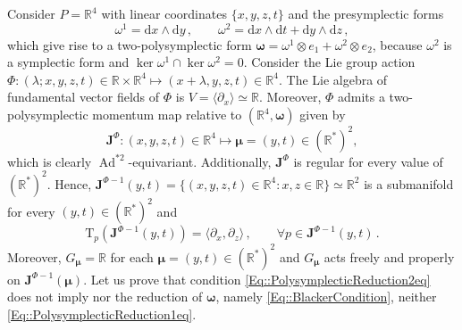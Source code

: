 \documentclass[11pt]{article}
\theoremstyle{plain}
\theoremstyle{definition}
\newcommand{\T}{\mathrm{T}}
\newcommand{\bomega}{{\boldsymbol{\omega}}}
\renewcommand{\d}{\mathrm{d}}
\DeclareMathOperator{\Ad}{Ad}
\def\d{\mathrm{d}}
\numberwithin{equation}{section}
\begin{document}
Consider $P=\mathbb{R}^4$ with linear coordinates $\{x,y,z,t\}$ and the presymplectic forms
$$
    \omega^1 = \d x\wedge \d y\,,\qquad \omega^2 = \d x\wedge \d t + \d y\wedge\d z\,,
$$
which give rise to a two-polysymplectic form $\bm\omega=\omega^1\otimes e_1+\omega^2\otimes e_2$, because $\omega^2$ is a symplectic form and $\ker\omega^1\cap \ker \omega^2=0$.
Consider the Lie group action 
$\Phi:(\lambda;x,y,z,t)\in \mathbb{R}\times \mathbb{R}^4\mapsto (x+\lambda,y,z,t)\in \mathbb{R}^4$. The Lie algebra of fundamental vector fields of $\Phi$ is $V=\langle \partial_x\rangle\simeq \mathbb{R}$. Moreover, $\Phi$ admits a two-polysymplectic momentum map relative to $(\mathbb{R}^4,\bomega)$ given by 
$$
    \mathbf{J}^\Phi:(x,y,z,t)\in \mathbb{R}^4\longmapsto \bm\mu=(y,t)\in (\mathbb{R}^*)^2,
$$
which is clearly $\Ad^{*2}$-equivariant. Additionally, $\mathbf{J}^\Phi$ is regular for every value of $(\mathbb{R}^*)^2$. Hence,
$\mathbf{J}^{\Phi-1}(y,t)=\{(x,y,z,t)\in \mathbb{R}^4:x,z\in \mathbb{R}\}\simeq \mathbb{R}^2$ is a submanifold for every $(y,t)\in (\mathbb{R}^*)^2$ and
$$
    \T_p(\mathbf{J}^{\Phi-1}(y,t))=\langle \partial_x,\partial_z\rangle\,,\qquad \forall p\in \mathbf{J}^{\Phi-1}(y,t)\,.
$$
Moreover, $G_{\bm\mu}=\mathbb{R}$ for each ${\bm\mu}=(y,t)\in (\mathbb{R}^*)^2$ and $G_{\bm\mu}$ acts freely and properly on $\mathbf{J}^{\Phi-1}(\bm\mu)$. 
Let us prove that condition \eqref{Eq::PolysymplecticReduction2eq} does not imply nor the reduction of $\boldsymbol{\omega}$, namely \eqref{Eq::BlackerCondition},  neither \eqref{Eq::PolysymplecticReduction1eq}. 
\end{document}
